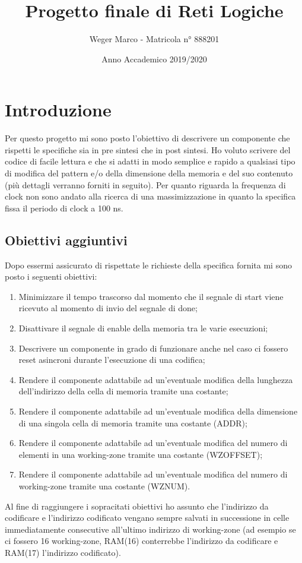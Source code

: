 \documentclass{article}
\begin{document}
\title{Progetto finale di Reti Logiche}
\author{Weger Marco - Matricola n° 888201}
\date{Anno Accademico 2019/2020}
\maketitle

\tableofcontents

\newpage
{}
\section{Introduzione}
Per questo progetto mi sono posto l'obiettivo di descrivere un componente che rispetti le specifiche sia in pre sintesi che in post sintesi.
Ho voluto scrivere del codice di facile lettura e che si adatti in modo semplice e rapido a qualsiasi tipo di modifica del pattern e/o della dimensione della memoria e del suo contenuto (più dettagli verranno forniti in seguito).
Per quanto riguarda la frequenza di clock non sono andato alla ricerca di una massimizzazione in quanto la specifica fissa il periodo di clock a 100 ns.
\subsection{Obiettivi aggiuntivi}
Dopo essermi assicurato di rispettate le richieste della specifica fornita mi sono posto i seguenti obiettivi:
\begin{enumerate}
	\item Minimizzare il tempo trascorso dal momento che il segnale di start viene ricevuto al momento di invio del segnale di done;
	\item Disattivare il segnale di enable della memoria tra le varie esecuzioni;
	\item Descrivere un componente in grado di funzionare anche nel caso ci fossero reset asincroni durante l'esecuzione di una codifica;
	\item Rendere il componente adattabile ad un'eventuale modifica della lunghezza dell'indirizzo della cella di memoria tramite una costante;
	\item Rendere il componente adattabile ad un'eventuale modifica della dimensione di una singola cella di memoria tramite una costante (ADDR);
	\item Rendere il componente adattabile ad un'eventuale modifica del numero di elementi in una working-zone tramite una costante (WZ\textunderscore OFFSET);
	\item Rendere il componente adattabile ad un'eventuale modifica del numero di working-zone tramite una costante (WZ\textunderscore NUM).
\end{enumerate}
Al fine di raggiungere i sopracitati obiettivi ho assunto che l'indirizzo da codificare e l'indirizzo codificato vengano sempre salvati in successione in celle immediatamente consecutive all'ultimo indirizzo di working-zone (ad esempio se ci fossero 16 working-zone, RAM(16) conterrebbe l'indirizzo da codificare e RAM(17) l'indirizzo codificato).
\end{document}
